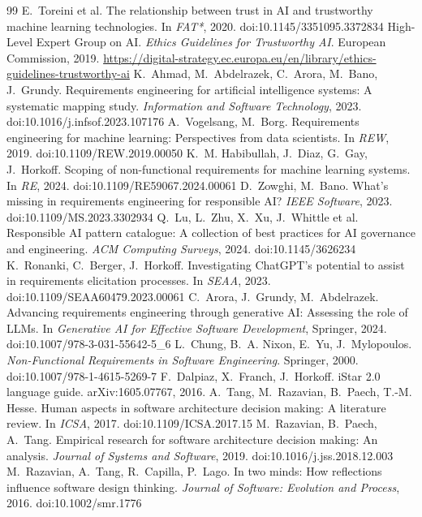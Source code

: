 \documentclass[10pt,twocolumn]{article}
\begin{document}
\begin{thebibliography}{99}
 E.~Toreini et al. The relationship between trust in AI and trustworthy machine learning technologies. In \emph{FAT*}, 2020. doi:10.1145/3351095.3372834
 High-Level Expert Group on AI. \emph{Ethics Guidelines for Trustworthy AI}. European Commission, 2019. \url{https://digital-strategy.ec.europa.eu/en/library/ethics-guidelines-trustworthy-ai}
 K.~Ahmad, M.~Abdelrazek, C.~Arora, M.~Bano, J.~Grundy. Requirements engineering for artificial intelligence systems: A systematic mapping study. \emph{Information and Software Technology}, 2023. doi:10.1016/j.infsof.2023.107176
 A.~Vogelsang, M.~Borg. Requirements engineering for machine learning: Perspectives from data scientists. In \emph{REW}, 2019. doi:10.1109/REW.2019.00050
 K.~M. Habibullah, J.~Diaz, G.~Gay, J.~Horkoff. Scoping of non-functional requirements for machine learning systems. In \emph{RE}, 2024. doi:10.1109/RE59067.2024.00061
 D.~Zowghi, M.~Bano. What's missing in requirements engineering for responsible AI? \emph{IEEE Software}, 2023. doi:10.1109/MS.2023.3302934
 Q.~Lu, L.~Zhu, X.~Xu, J.~Whittle et al. Responsible AI pattern catalogue: A collection of best practices for AI governance and engineering. \emph{ACM Computing Surveys}, 2024. doi:10.1145/3626234
 K.~Ronanki, C.~Berger, J.~Horkoff. Investigating ChatGPT's potential to assist in requirements elicitation processes. In \emph{SEAA}, 2023. doi:10.1109/SEAA60479.2023.00061
 C.~Arora, J.~Grundy, M.~Abdelrazek. Advancing requirements engineering through generative AI: Assessing the role of LLMs. In \emph{Generative AI for Effective Software Development}, Springer, 2024. doi:10.1007/978-3-031-55642-5\_6
 L.~Chung, B.~A. Nixon, E.~Yu, J.~Mylopoulos. \emph{Non-Functional Requirements in Software Engineering}. Springer, 2000. doi:10.1007/978-1-4615-5269-7
 F.~Dalpiaz, X.~Franch, J.~Horkoff. iStar 2.0 language guide. arXiv:1605.07767, 2016.
 A.~Tang, M.~Razavian, B.~Paech, T.-M. Hesse. Human aspects in software architecture decision making: A literature review. In \emph{ICSA}, 2017. doi:10.1109/ICSA.2017.15
 M.~Razavian, B.~Paech, A.~Tang. Empirical research for software architecture decision making: An analysis. \emph{Journal of Systems and Software}, 2019. doi:10.1016/j.jss.2018.12.003
 M.~Razavian, A.~Tang, R.~Capilla, P.~Lago. In two minds: How reflections influence software design thinking. \emph{Journal of Software: Evolution and Process}, 2016. doi:10.1002/smr.1776

\end{thebibliography}
\end{document}
